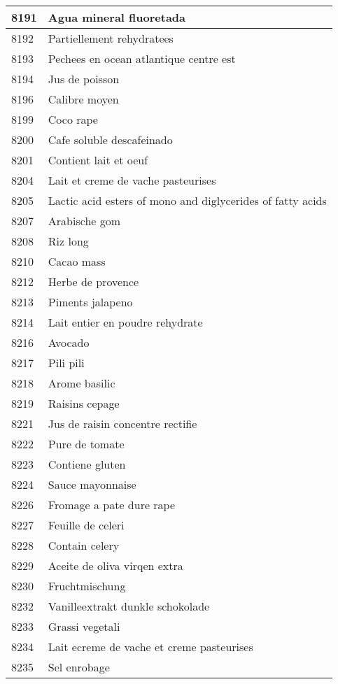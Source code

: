 \begin{longtable}{|l|l|}
8191 & Agua mineral fluoretada \\ \hline 
8192 & Partiellement rehydratees \\ \hline 
8193 & Pechees en ocean atlantique centre est \\ \hline 
8194 & Jus de poisson \\ \hline 
8196 & Calibre moyen \\ \hline 
8199 & Coco rape \\ \hline 
8200 & Cafe soluble descafeinado \\ \hline 
8201 & Contient lait et oeuf \\ \hline 
8204 & Lait et creme de vache pasteurises \\ \hline 
8205 & Lactic acid esters of mono and diglycerides of fatty acids \\ \hline 
8207 & Arabische gom \\ \hline 
8208 & Riz long \\ \hline 
8210 & Cacao mass \\ \hline 
8212 & Herbe de provence \\ \hline 
8213 & Piments jalapeno \\ \hline 
8214 & Lait entier en poudre rehydrate \\ \hline 
8216 & Avocado \\ \hline 
8217 & Pili pili \\ \hline 
8218 & Arome basilic \\ \hline 
8219 & Raisins cepage \\ \hline 
8221 & Jus de raisin concentre rectifie \\ \hline 
8222 & Pure de tomate \\ \hline 
8223 & Contiene gluten \\ \hline 
8224 & Sauce mayonnaise \\ \hline 
8226 & Fromage a pate dure rape \\ \hline 
8227 & Feuille de celeri \\ \hline 
8228 & Contain celery \\ \hline 
8229 & Aceite de oliva virqen extra \\ \hline 
8230 & Fruchtmischung \\ \hline 
8232 & Vanilleextrakt dunkle schokolade \\ \hline 
8233 & Grassi vegetali \\ \hline 
8234 & Lait ecreme de vache et creme pasteurises \\ \hline 
8235 & Sel enrobage \\ \hline 

\end{longtable}
